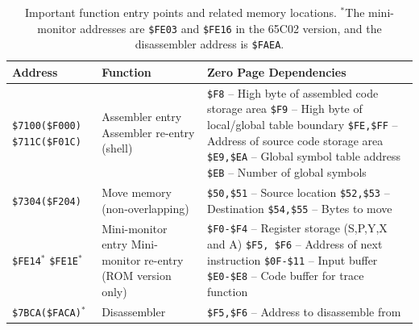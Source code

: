 \documentclass[12pt]{article}
\begin{document}
\begin{table}[htb]
	\centering
	\begin{tabular}{|p{2.8cm}|p{4.7cm}|p{8.5cm}|}
		\hline
		\textbf{Address} & \textbf{Function} & \textbf{Zero Page Dependencies} \\
		\hline
		\texttt{\$7100(\$F000)} \newline
		\texttt{\$711C(\$F01C)} & 
		\raggedright Assembler entry Assembler re-entry (shell) & 
		\texttt{\$F8} -- High byte of assembled code storage area \newline
		\texttt{\$F9} -- High byte of local/global table boundary \newline
		\texttt{\$FE,\$FF} -- Address of source code storage area \newline
		\texttt{\$E9,\$EA} -- Global symbol table address \newline
		\texttt{\$EB} -- Number of global symbols \\
		\hline
		\texttt{\$7304(\$F204)} & 
		\raggedright Move memory (non\hbox{-}overlapping) & 
		\texttt{\$50,\$51} -- Source location \newline
		\texttt{\$52,\$53} -- Destination \newline
		\texttt{\$54,\$55} -- Bytes to move \\
		\hline
		\texttt{\$FE14}\ensuremath{^{*}} \newline
		\texttt{\$FE1E}\ensuremath{^{*}} & 
		\raggedright Mini-monitor entry \newline
		Mini-monitor re-entry (ROM version only) & 
		\texttt{\$F0-\$F4} -- Register storage (S,P,Y,X and A) \newline
		\texttt{\$F5, \$F6} -- Address of next instruction \newline
		\texttt{\$0F-\$11} -- Input buffer \newline
		\texttt{\$E0-\$E8} -- Code buffer for trace function \\
		\hline
		\texttt{\$7BCA(\$FACA)}\ensuremath{^{*}} & 
		Disassembler & 
		\texttt{\$F5,\$F6} -- Address to disassemble from \\
		\hline
	\end{tabular}
	\caption{Important function entry points and related memory locations. \ensuremath{^{*}}The mini-monitor addresses are \texttt{\$FE03} and \texttt{\$FE16} in the 65C02 version, and the disassembler address is \texttt{\$FAEA}.}
	\label{tab:entrypoints}
\end{table}

\end{document}
